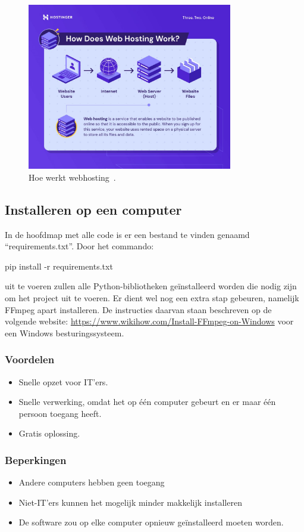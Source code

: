 \begin{figure}
    \centering
    \includegraphics[width=0.8\textwidth]{./img/how-does-web-hosting-work}
    \caption{\label{fig:webhosting_scheme} Hoe werkt webhosting~\autocite{Tamara2022}.}
\end{figure}

\subsection{Installeren op een computer}
In de hoofdmap met alle code is er een bestand te vinden genaamd ``requirements.txt''. Door het commando:
\begin{python}
    pip install -r requirements.txt
\end{python}
uit te voeren zullen alle Python-bibliotheken geïnstalleerd worden die nodig zijn om het project uit te voeren. Er dient wel nog een extra stap gebeuren, namelijk FFmpeg apart installeren. De instructies daarvan staan beschreven op de volgende website: \url{https://www.wikihow.com/Install-FFmpeg-on-Windows} voor een Windows besturingssysteem.

\subsubsection{Voordelen}
\begin{itemize}
    \item Snelle opzet voor IT'ers.
    \item Snelle verwerking, omdat het op één computer gebeurt en er maar één persoon toegang heeft.
    \item Gratis oplossing.
\end{itemize}
\subsubsection{Beperkingen}
\begin{itemize}
    \item Andere computers hebben geen toegang
    \item Niet-IT'ers kunnen het mogelijk minder makkelijk installeren
    \item De software zou op elke computer opnieuw geïnstalleerd moeten worden.
\end{itemize}

